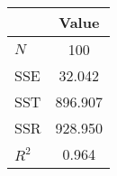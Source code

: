 \begin{tabular}{lc}
 & Value \\ 
\hline$N$   & 100 \\ 
SSE   & 32.042 \\ 
SST   & 896.907 \\ 
SSR   & 928.950 \\ 
$R^2$ & 0.964 \\ 
\hline\end{tabular}
